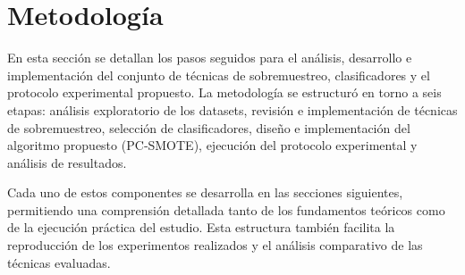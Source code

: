 \section{Metodología}

En esta sección se detallan los pasos seguidos para el análisis, desarrollo e implementación del conjunto de técnicas de sobremuestreo, clasificadores y el protocolo experimental propuesto. La metodología se estructuró en torno a seis etapas: análisis exploratorio de los datasets, revisión e implementación de técnicas de sobremuestreo, selección de clasificadores, diseño e implementación del algoritmo propuesto (PC‑SMOTE), ejecución del protocolo experimental y análisis de resultados.

Cada uno de estos componentes se desarrolla en las secciones siguientes, permitiendo una comprensión detallada tanto de los fundamentos teóricos como de la ejecución práctica del estudio. Esta estructura también facilita la reproducción de los experimentos realizados y el análisis comparativo de las técnicas evaluadas.
